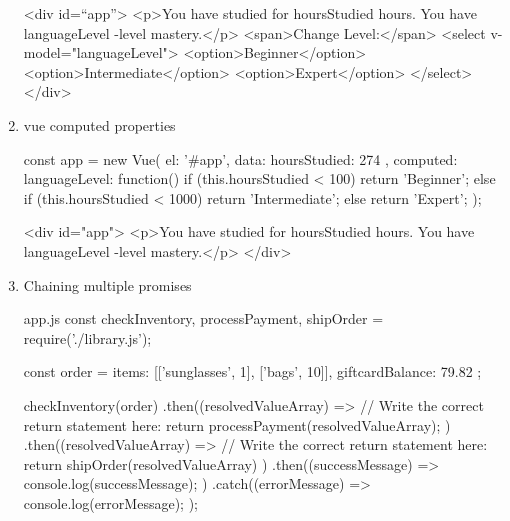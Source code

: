 \documentclass[a4paper,12pt]{article}
\begin{document}
\begin{enumerate}
\begin{jscode}
<div id=“app”>
  <p>You have studied for {{ hoursStudied }} hours. You have {{ languageLevel }}-level mastery.</p>
  <span>Change Level:</span>
  <select v-model="languageLevel">
    <option>Beginner</option>
    <option>Intermediate</option>
    <option>Expert</option>
  </select>
</div>
\end{jscode}

\item vue computed properties
\begin{jscode}
const app = new Vue({
  el: '#app',
  data: {
    hoursStudied: 274
  },
  computed: {
    languageLevel: function() {
      if (this.hoursStudied < 100) {
        return 'Beginner';
      } else if (this.hoursStudied < 1000) {
        return 'Intermediate';
      } else {
        return 'Expert';
      }
    }
  }
});

<div id="app">
  <p>You have studied for {{ hoursStudied }} hours. You have {{ languageLevel }}-level mastery.</p>
</div>
\end{jscode}

\item Chaining multiple promises
\begin{jscode}
app.js
const {checkInventory, processPayment, shipOrder} = require('./library.js');

const order = {
  items: [['sunglasses', 1], ['bags', 10]],
  giftcardBalance: 79.82
};

checkInventory(order)
.then((resolvedValueArray) => {
  // Write the correct return statement here:
  return processPayment(resolvedValueArray);
})
.then((resolvedValueArray) => {
  // Write the correct return statement here:
  return shipOrder(resolvedValueArray)
})
.then((successMessage) => {
  console.log(successMessage);
})
.catch((errorMessage) => {
  console.log(errorMessage);
});
\end{jscode}

\end{enumerate}
\end{document}
